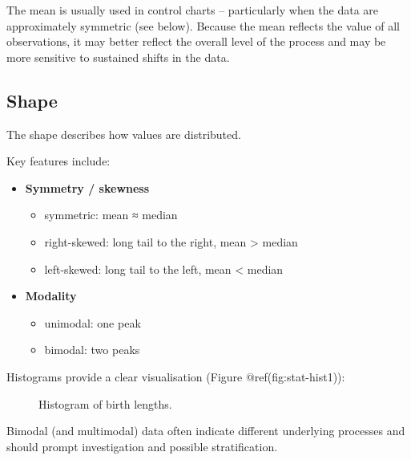 \documentclass[
]{book}
\makeatletter
\newenvironment{Shaded}{\begin{snugshade}}{\end{snugshade}}
\newcommand{\FunctionTok}[1]{\textcolor[rgb]{0.13,0.29,0.53}{\textbf{#1}}}
\newcommand{\NormalTok}[1]{#1}
\newcommand{\SpecialCharTok}[1]{\textcolor[rgb]{0.81,0.36,0.00}{\textbf{#1}}}
\newcommand*\pandocbounded[1]{%
  \sbox\pandoc@box{#1}%
  \Gscale@div\@tempa{\textheight}{\dimexpr\ht\pandoc@box+\dp\pandoc@box\relax}%
  \Gscale@div\@tempb{\linewidth}{\wd\pandoc@box}%
  \ifdim\@tempb\p@<\@tempa\p@\let\@tempa\@tempb\fi%
  \ifdim\@tempa\p@<\p@\scalebox{\@tempa}{\usebox\pandoc@box}%
  \else\usebox{\pandoc@box}%
  \fi%
}
\providecommand{\tightlist}{%
  \setlength{\itemsep}{0pt}\setlength{\parskip}{0pt}}
\makeatother
\begin{document}
The mean is usually used in control charts -- particularly when the data
are approximately symmetric (see below). Because the mean reflects the
value of all observations, it may better reflect the overall level of
the process and may be more sensitive to sustained shifts in the data.

\subsection{Shape}\label{shape}

The shape describes how values are distributed.

Key features include:

\begin{itemize}
\tightlist
\item
  \textbf{Symmetry / skewness}

  \begin{itemize}
  \tightlist
  \item
    symmetric: mean ≈ median
  \item
    right-skewed: long tail to the right, mean \textgreater{} median
  \item
    left-skewed: long tail to the left, mean \textless{} median
  \end{itemize}
\item
  \textbf{Modality}

  \begin{itemize}
  \tightlist
  \item
    unimodal: one peak
  \item
    bimodal: two peaks
  \end{itemize}
\end{itemize}

Histograms provide a clear visualisation (Figure @ref(fig:stat-hist1)):

\begin{Shaded}
\end{Shaded}

\begin{figure}
\centering
\pandocbounded{}
\caption{Histogram of birth lengths.}
\end{figure}

Bimodal (and multimodal) data often indicate different underlying
processes and should prompt investigation and possible stratification.
\end{document}

